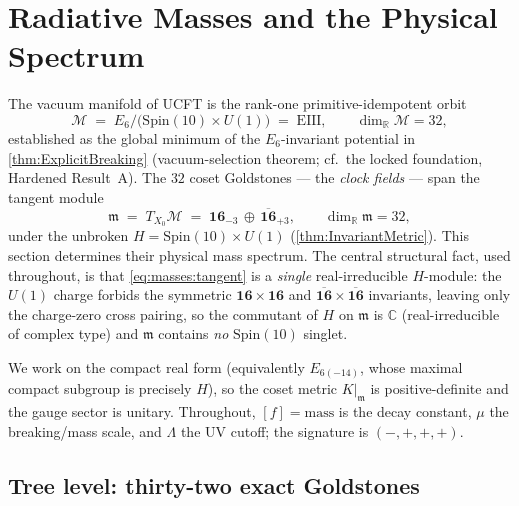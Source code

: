\documentclass[11pt]{article}
\theoremstyle{plain}
\theoremstyle{definition}
\theoremstyle{remark}
\begin{document}
\section{Radiative Masses and the Physical Spectrum}
\label{sec:masses:main}

The vacuum manifold of UCFT is the rank-one primitive-idempotent orbit
\[
  \mathcal{M} \;=\; E_{6}/\bigl(\mathrm{Spin}(10)\times U(1)\bigr) \;=\; \mathrm{EIII},
  \qquad \dim_{\mathbb R}\mathcal{M} = 32,
\]
established as the global minimum of the $E_{6}$-invariant potential in
\autoref{thm:ExplicitBreaking} (vacuum-selection theorem; cf.\ the locked
foundation, Hardened Result~A). The $32$ coset Goldstones --- the
\emph{clock fields} --- span the tangent module
\begin{equation}\label{eq:masses:tangent}
  \mathfrak m \;=\; T_{X_{0}}\mathcal{M}
  \;=\; \mathbf{16}_{-3}\,\oplus\,\overline{\mathbf{16}}_{+3},
  \qquad \dim_{\mathbb R}\mathfrak m = 32,
\end{equation}
under the unbroken $H=\mathrm{Spin}(10)\times U(1)$ (\autoref{thm:InvariantMetric}).
This section determines their physical mass spectrum. The central structural
fact, used throughout, is that \eqref{eq:masses:tangent} is a \emph{single}
real-irreducible $H$-module: the $U(1)$ charge forbids the symmetric
$\mathbf{16}\times\mathbf{16}$ and $\overline{\mathbf{16}}\times\overline{\mathbf{16}}$
invariants, leaving only the charge-zero cross pairing, so the commutant of
$H$ on $\mathfrak m$ is $\mathbb C$ (real-irreducible of complex type) and
$\mathfrak m$ contains \emph{no} $\mathrm{Spin}(10)$ singlet.

We work on the compact real form (equivalently $E_{6(-14)}$, whose maximal
compact subgroup is precisely $H$), so the coset metric $K|_{\mathfrak m}$ is
positive-definite and the gauge sector is unitary. Throughout, $[f]=\text{mass}$
is the decay constant, $\mu$ the breaking/mass scale, and $\Lambda$ the UV
cutoff; the signature is $(-,+,+,+)$.

\subsection{Tree level: thirty-two exact Goldstones}
\label{sec:masses:tree}
\end{document}
